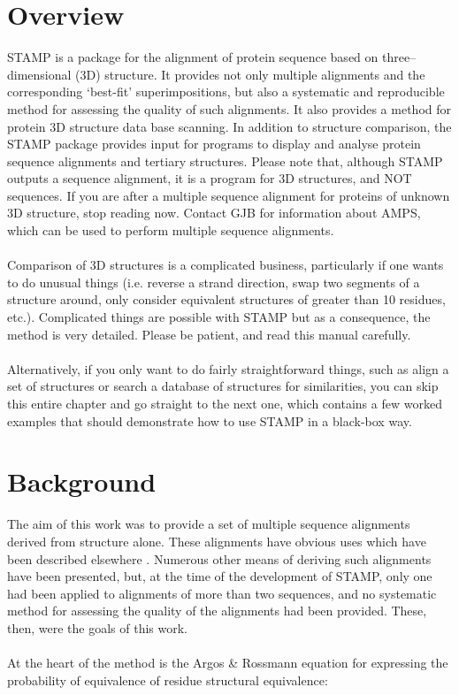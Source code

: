 \section{Overview}

STAMP is a package for the alignment of protein sequence based on
three--dimensional (3D) structure.  It provides not only multiple
alignments and the corresponding `best-fit' superimpositions, but
also a systematic and reproducible method for assessing the
quality of such alignments.  It also provides a method for protein
3D structure data base scanning.  In addition to structure
comparison, the STAMP package provides input for programs to
display and analyse protein sequence alignments and tertiary structures.
Please note that, although STAMP outputs a sequence alignment, it is 
a program for 3D structures, and NOT sequences.  If 
you are after a multiple sequence alignment for proteins of unknown 3D 
structure, stop reading now.  Contact GJB for information
about AMPS, which can be used to perform multiple sequence
alignments.\\
\\
Comparison of 3D structures is a complicated
business, particularly if one wants to do unusual things (i.e.
reverse a strand direction, swap two segments of a structure
around, only consider equivalent structures of greater
than 10 residues, etc.).  Complicated things are possible with STAMP but
as a consequence, the method is very detailed.  Please be patient, and 
read this manual carefully.\\
\\
Alternatively, if you only want to do fairly straightforward things, such
as align a set of structures or search a database of structures for
similarities, you can skip this entire chapter and go straight to the
next one, which contains a few worked examples that should demonstrate how
to use STAMP in a black-box way.

\section{Background}

The aim of this work was to provide a set of multiple sequence
alignments derived from structure alone.  These alignments have 
obvious uses which have been described elsewhere \cite{rb92b,sali90}.  
Numerous other means of deriving such alignments have been 
presented, but, at the time of the development of STAMP, only one had
been applied to alignments of more than two sequences, and no 
systematic method for assessing the quality of the alignments had 
been provided.  These, then, were the goals of this work.\\
\\
At the heart of the method is the Argos \& Rossmann \cite{argos76}
equation for expressing the probability of equivalence of
residue structural equivalence:\\

